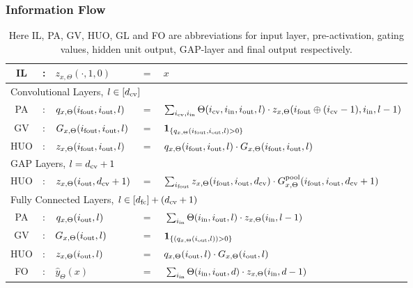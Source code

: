 \subsubsection{Information Flow}
\begin{table}[h]
\centering
\begin{tabular}{|c l lll|}\hline
IL&: &$z_{x,\Theta}(\cdot,1,0)$ &$=$ &$x$ \\\hline\hline
\multicolumn{5}{|l|}{Convolutional Layers, $l\in[d_{\text{cv}}]$}\\\hline\hline
PA&: & $q_{x,\Theta}(i_{\text{fout}},i_{\text{out}},l)$& $=$ & $\sum_{i_{\text{cv}},i_{\text{in}}}\Theta(i_{\text{cv}},i_{\text{in}},i_{\text{out}},l)\cdot z_{x,\Theta}(i_{\text{fout}}\oplus (i_{\text{cv}}-1),i_{\text{in}},l-1)$\\
GV&: &$G_{x,\Theta}(i_{\text{fout}},i_{\text{out}},l)$& $=$ & $\mathbf{1}_{\{q_{x,\Theta}(i_{\text{fout}},i_{\text{out}},l)>0\}}$\\
HUO&: &$z_{x,\Theta}(i_{\text{fout}},i_{\text{out}},l)$ & $=$ & $q_{x,\Theta}(i_{\text{fout}},i_{\text{out}},l)\cdot G_{x,\Theta}(i_{\text{fout}},i_{\text{out}},l)$\\\hline\hline
\multicolumn{5}{|l|}{GAP Layers, $l=d_{\text{cv}}+1$}\\\hline\hline
HUO&: &$z_{x,\Theta}(i_{\text{out}}, d_{\text{cv}}+1)$ & $=$ &$\sum_{i_{\text{fout}}} z_{x,\Theta}(i_{\text{fout}},i_{\text{out}},d_{\text{cv}})\cdot G^{\text{pool}}_{x,\Theta}(i_{\text{fout}},i_{\text{out}},d_{\text{cv}}+1)$\\\hline\hline
\multicolumn{5}{|l|}{Fully Connected Layers, $l\in[d_{\text{fc}}]+(d_{\text{cv}}+1)$}\\\hline\hline
PA&: & $q_{x,\Theta}(i_{\text{out}},l)$& $=$ & $\sum_{i_{\text{in}}}\Theta(i_{\text{in}},i_{\text{out}},l) \cdot z_{x,\Theta}(i_{\text{in}},l-1) $\\
GV&: &$G_{x,\Theta}(i_{\text{out}},l)$& $=$ & $\mathbf{1}_{\{(q_{x,\Theta}(i_{\text{out}},l))>0\}}$\\
HUO&: &$z_{x,\Theta}(i_{\text{out}},l)$ & $=$ & $q_{x,\Theta}(i_{\text{out}},l)\cdot G_{x,\Theta}(i_{\text{out}},l)$\\
FO&: & $\hat{y}_{\Theta}(x)$ & $=$ & $\sum_{i_{\text{in}}}\Theta(i_{\text{in}},i_{\text{out}}, d)\cdot z_{x,\Theta}(i_{\text{in}},d-1)$\\\hline
\end{tabular}
\caption{Here IL, PA, GV, HUO, GL and FO are abbreviations for input layer, pre-activation, gating values, hidden unit output, GAP-layer and final output respectively.}
\label{tb:cconv}
\end{table}

\FloatBarrier
\begin{figure}[H]
\centering
{}
\end{figure}
\newpage
